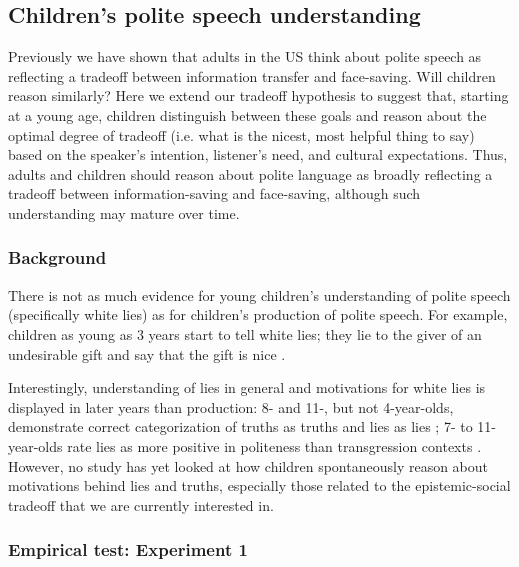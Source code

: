 \subsection{Children's polite speech understanding}
\label{sec:child}

Previously we have shown that adults in the US think about polite speech as reflecting a tradeoff between information transfer and face-saving. Will children reason similarly? Here we extend our tradeoff hypothesis to suggest that, starting at a young age, children distinguish between these goals and reason about the optimal degree of tradeoff (i.e. what is the nicest, most helpful thing to say) based on the speaker's intention, listener's need, and cultural expectations. Thus, adults and children should reason about polite language as broadly reflecting a tradeoff between information-saving and face-saving, although such understanding may mature over time. 

\subsubsection{Background}

There is not as much evidence for young children's understanding of polite speech (specifically white lies) as for children's production of polite speech. For example, children as young as 3 years start to tell white lies; they lie to the giver of an undesirable gift and say that the gift is nice \citep{talwar2007}. 

Interestingly, understanding of lies in general and motivations for white lies is displayed in later years than production: 8- and 11-, but not 4-year-olds, demonstrate correct categorization of truths as truths and lies as lies \citep{bussey1999}; 7- to 11-year-olds rate lies as more positive in politeness than transgression contexts \citep{heyman2009}. However, no study has yet looked at how children spontaneously reason about motivations behind lies and truths, especially those related to the epistemic-social tradeoff that we are currently interested in. 

\subsubsection{Empirical test: Experiment 1}

